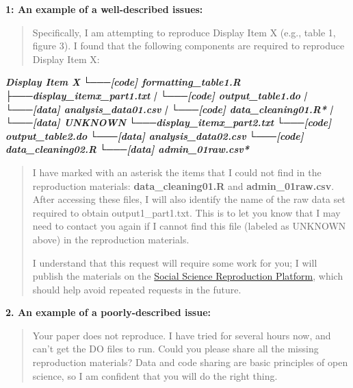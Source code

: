 \documentclass[
  openany]{book}
\newenvironment{Shaded}{\begin{snugshade}}{\end{snugshade}}
\newcommand{\InformationTok}[1]{\textcolor[rgb]{0.56,0.35,0.01}{\textbf{\textit{#1}}}}
\begin{document}
\textbf{1: An example of a well-described issues:}

\begin{quote}
Specifically, I am attempting to reproduce Display Item X (e.g., table 1, figure 3). I found that the following components are required to reproduce Display Item X:
\end{quote}

\begin{Shaded}
\begin{Highlighting}[]
\InformationTok{         Display Item X}
\InformationTok{            └───[code] formatting\_table1.R}
\InformationTok{                ├───display\_itemx\_part1.txt  }
\InformationTok{                |   └───[code] output\_table1.do           }
\InformationTok{                |       └───[data] analysis\_data01.csv}
\InformationTok{                |          └───[code] data\_cleaning01.R*}
\InformationTok{                |             └───[data] UNKNOWN}
\InformationTok{                └───display\_itemx\_part2.txt  }
\InformationTok{                    └───[code] output\_table2.do           }
\InformationTok{                        └───[data] analysis\_data02.csv}
\InformationTok{                           └───[code] data\_cleaning02.R}
\InformationTok{                              └───[data] admin\_01raw.csv* }
\end{Highlighting}
\end{Shaded}

\begin{quote}
I have marked with an asterisk the items that I could not find in the reproduction materials: \textbf{data\_cleaning01.R} and \textbf{admin\_01raw.csv}. After accessing these files, I will also identify the name of the raw data set required to obtain output1\_part1.txt. This is to let you know that I may need to contact you again if I cannot find this file (labeled as UNKNOWN above) in the reproduction materials.

I understand that this request will require some work for you; I will publish the materials on the \href{https://www.socialsciencereproduction.org/}{Social Science Reproduction Platform}, which should help avoid repeated requests in the future.
\end{quote}

\textbf{2. An example of a poorly-described issue:}

\begin{quote}
Your paper does not reproduce. I have tried for several hours now, and can't get the DO files to run. Could you please share all the missing reproduction materials? Data and code sharing are basic principles of open science, so I am confident that you will do the right thing.
\end{quote}
\end{document}
